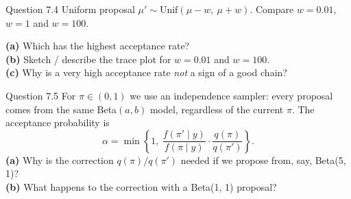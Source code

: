 \documentclass[aspectratio=43,11pt]{beamer}
\begin{document}
\begin{frame}{Question 7.4}
  Uniform proposal $\mu' \sim \text{Unif}(\mu - w,\ \mu + w)$.
  Compare $w = 0.01$, $w = 1$ and $w = 100$.
  \vspace{0.6em}

  \textbf{(a)} Which has the highest acceptance rate? \\[0.3em]
  \textbf{(b)} Sketch / describe the trace plot for $w = 0.01$ and
  $w = 100$. \\[0.3em]
  \textbf{(c)} Why is a very high acceptance rate \emph{not} a sign of a good
  chain?
\end{frame}

\begin{frame}{Question 7.5}
  For $\pi \in (0,1)$ we use an independence sampler: every proposal
  comes from the same Beta$(a,b)$ model, regardless of the current $\pi$.
  The acceptance probability is
  \[
    \alpha = \min\left\{1,\
      \frac{f(\pi' \mid y)}{f(\pi \mid y)} \cdot
      \frac{q(\pi)}{q(\pi')}\right\}.
  \]
  \textbf{(a)} Why is the correction $q(\pi)/q(\pi')$ needed if we propose
  from, say, Beta(5, 1)? \\[0.3em]
  \textbf{(b)} What happens to the correction with a Beta(1, 1) proposal?
\end{frame}

%
%  
%
%  
\end{document}
